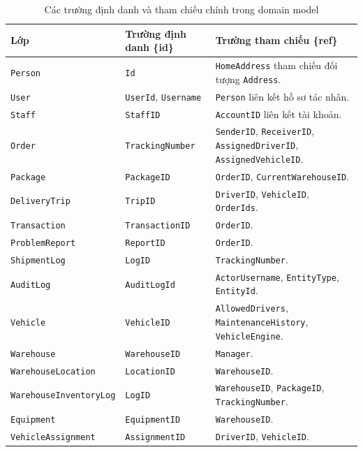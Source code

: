 \documentclass[12pt,a4paper]{article}
\begin{document}
\begin{table}[H]
\centering
\small
\begin{tabular}{p{3.2cm}p{4.0cm}p{6.7cm}}
\toprule
\textbf{Lớp} & \textbf{Trường định danh \{id\}} & \textbf{Trường tham chiếu \{ref\}} \\
\midrule
\texttt{Person} & \texttt{Id} & \texttt{HomeAddress} tham chiếu đối tượng \texttt{Address}. \\
\texttt{User} & \texttt{UserId}, \texttt{Username} & \texttt{Person} liên kết hồ sơ tác nhân. \\
\texttt{Staff} & \texttt{StaffID} & \texttt{AccountID} liên kết tài khoản. \\
\texttt{Order} & \texttt{TrackingNumber} & \texttt{SenderID}, \texttt{ReceiverID}, \texttt{AssignedDriverID}, \texttt{AssignedVehicleID}. \\
\texttt{Package} & \texttt{PackageID} & \texttt{OrderID}, \texttt{CurrentWarehouseID}. \\
\texttt{DeliveryTrip} & \texttt{TripID} & \texttt{DriverID}, \texttt{VehicleID}, \texttt{OrderIds}. \\
\texttt{Transaction} & \texttt{TransactionID} & \texttt{OrderID}. \\
\texttt{ProblemReport} & \texttt{ReportID} & \texttt{OrderID}. \\
\texttt{ShipmentLog} & \texttt{LogID} & \texttt{TrackingNumber}. \\
\texttt{AuditLog} & \texttt{AuditLogId} & \texttt{ActorUsername}, \texttt{EntityType}, \texttt{EntityId}. \\
\texttt{Vehicle} & \texttt{VehicleID} & \texttt{AllowedDrivers}, \texttt{MaintenanceHistory}, \texttt{VehicleEngine}. \\
\texttt{Warehouse} & \texttt{WarehouseID} & \texttt{Manager}. \\
\texttt{WarehouseLocation} & \texttt{LocationID} & \texttt{WarehouseID}. \\
\texttt{WarehouseInventoryLog} & \texttt{LogID} & \texttt{WarehouseID}, \texttt{PackageID}, \texttt{TrackingNumber}. \\
\texttt{Equipment} & \texttt{EquipmentID} & \texttt{WarehouseID}. \\
\texttt{VehicleAssignment} & \texttt{AssignmentID} & \texttt{DriverID}, \texttt{VehicleID}. \\
\bottomrule
\end{tabular}
\caption{Các trường định danh và tham chiếu chính trong domain model}
\end{table}
\end{document}
